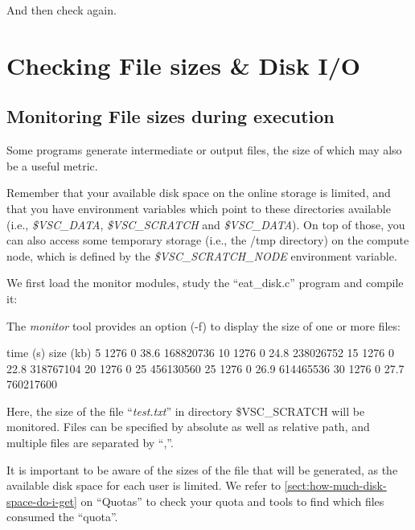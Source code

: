 And then check again.

\section{Checking File sizes \& Disk I/O}

\subsection{Monitoring File sizes during execution}

Some programs generate intermediate or output files, the size of which may also
be a useful metric.

Remember that your available disk space on the \hpc online storage is limited,
and that you have environment variables which point to these directories available
(i.e., \emph{\$VSC\_DATA}, \emph{\$VSC\_SCRATCH} and \emph{\$VSC\_DATA}).
On top of those, you can also access some temporary storage (i.e., the /tmp
directory) on the compute node, which is defined by the
\emph{\$VSC\_SCRATCH\_NODE} environment variable.

\ifgent
\else
  We first load the monitor modules, study the ``eat\_disk.c'' program and
  compile it:

\begin{prompt}
\end{prompt}

  The \emph{monitor} tool provides an option (-f) to display the size of one or
  more files:

\begin{prompt}
time (s) size (kb) %
5  1276  0 38.6 168820736
10  1276  0 24.8 238026752
15  1276  0 22.8 318767104
20  1276  0 25 456130560
25  1276  0 26.9 614465536
30  1276  0 27.7 760217600
\end{prompt}

  Here, the size of the file ``\emph{test.txt}'' in directory \$VSC\_SCRATCH will
  be monitored. Files can be specified by absolute as well as relative path, and
  multiple files are separated by ``,''.
\fi

It is important to be aware of the sizes of the file that will be generated, as
the available disk space for each user is limited.  We refer to \autoref{sect:how-much-disk-space-do-i-get} on
``Quotas'' to check your quota and tools to find which files consumed the
``quota''.

